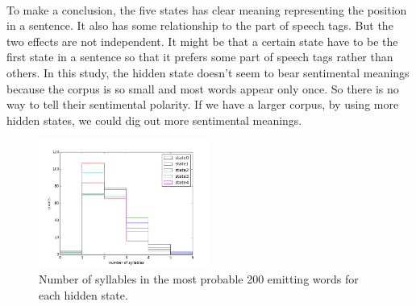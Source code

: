 \paragraph{}
To make a conclusion, the five states has clear meaning representing the position in a sentence. It also has some relationship to the part of speech tags. But the two effects are not independent. It might be that a certain state have to be the first state in a sentence so that it prefers some part of speech tags rather than others. In this study, the hidden state doesn't seem to bear sentimental meanings because the corpus is so small and most words appear only once. So there is no way to tell their sentimental polarity. If we have a larger corpus, by using more hidden states, we could dig out more sentimental meanings. 
 \begin{figure}
 \centering
 \includegraphics[width=0.5\textwidth]{./figure/numberofsyllablesinstates.png}
 \caption{Number of syllables in the most probable 200 emitting words for each hidden state.}
\end{figure}
